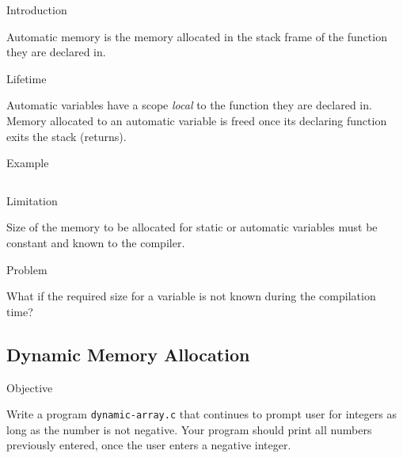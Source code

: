 \documentclass[compress]{beamer}
\begin{document}
\begin{slide}
	\begin{block}{Introduction}

	Automatic memory is the memory allocated in the \alert{stack} frame of the function they are declared in.

	\end{block}
\end{slide}

\begin{slide}
	\begin{block}{Lifetime}

	Automatic variables have a scope \emph{local} to the function they are declared in.
	Memory allocated to an automatic variable is freed once its declaring function exits the stack (returns).

	\end{block}
\end{slide}

\begin{slide}
	\begin{block}{Example}

	\inputminted[fontsize=\scriptsize, firstline=10, linenos]{c}{
		\resDirectory/automatic.c
	}

	\end{block}
\end{slide}

\begin{slide}
	\begin{block}{Limitation}

	Size of the memory to be allocated for static or automatic variables must be constant and known to the compiler.

	\end{block}
\end{slide}

\begin{slide}
	\begin{block}{Problem}

	What if the required size for a variable is not known during the compilation time?

	\end{block}
\end{slide}

\subsection{Dynamic Memory Allocation}

\begin{slide}
	\begin{block}{Objective}

	Write a program \texttt{dynamic-array.c} that continues to prompt user for integers as long as the number is not negative.
	Your program should print all numbers previously entered, once the user enters a negative integer.

	\end{block}
\end{slide}
\end{document}
